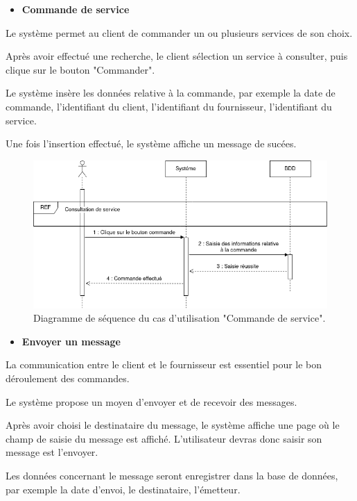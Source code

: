 \documentclass[french]{report}
\begin{document}
\begin{itemize}
\item \textbf{Commande de service}
\end{itemize}
    Le système permet au client de commander un ou plusieurs services de son choix.
    
    Après avoir effectué une recherche, le client sélection un service à consulter,
    puis clique sur le bouton "Commander".
    
    Le système insère les données relative à la commande, par exemple la date de commande,
    l'identifiant du client, l'identifiant du fournisseur, l'identifiant du service.
    
    Une fois l'insertion effectué, le système affiche un message de sucées.
        
    \begin{figure}[H]
            \centering
            \includegraphics[width=1\textwidth]{images/Seq Diag Commande Service.drawio.png}
            \caption{Diagramme de séquence du cas d'utilisation "Commande de service".}
            \label{Seq Diag Commande service}
    \end{figure}
    
    \begin{itemize}
\item \textbf{Envoyer un message}
\end{itemize}
    La communication entre le client et le fournisseur est essentiel
    pour le bon déroulement des commandes.
    
    Le système propose un moyen d'envoyer et de recevoir des messages.
    
    Après avoir choisi le destinataire du message, le système affiche une
    page où le champ de saisie du message est affiché. L'utilisateur devras donc saisir son message est l'envoyer.
    
    Les données concernant le message seront enregistrer dans la base de données,
    par exemple la date d'envoi, le destinataire, l'émetteur.
        
\end{document}
